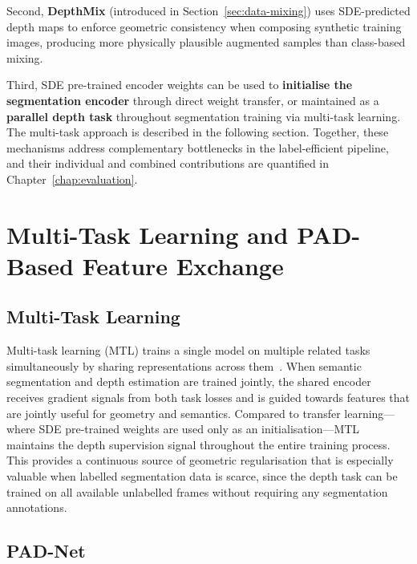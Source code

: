 Second, \textbf{DepthMix} (introduced in Section~\ref{sec:data-mixing}) uses
SDE-predicted depth maps to enforce geometric consistency when composing
synthetic training images, producing more physically plausible augmented
samples than class-based mixing.

Third, SDE pre-trained encoder weights can be used to \textbf{initialise
the segmentation encoder} through direct weight transfer, or maintained
as a \textbf{parallel depth task} throughout segmentation training via
multi-task learning. The multi-task approach is described in the
following section. Together, these mechanisms address complementary
bottlenecks in the label-efficient pipeline, and their individual and
combined contributions are quantified in Chapter~\ref{chap:evaluation}.

\section{Multi-Task Learning and PAD-Based Feature Exchange}
\label{sec:mtl}

\subsection{Multi-Task Learning}

Multi-task learning (MTL) trains a single model on multiple related tasks
simultaneously by sharing representations across
them~\cite{caruana1997multitask}. When semantic segmentation and depth
estimation are trained jointly, the shared encoder receives gradient
signals from both task losses and is guided towards features that are
jointly useful for geometry and semantics. Compared to transfer
learning---where SDE pre-trained weights are used only as an
initialisation---MTL maintains the depth supervision signal throughout
the entire training process. This provides a continuous source of
geometric regularisation that is especially valuable when labelled
segmentation data is scarce, since the depth task can be trained on all
available unlabelled frames without requiring any segmentation annotations.

\subsection{PAD-Net}

